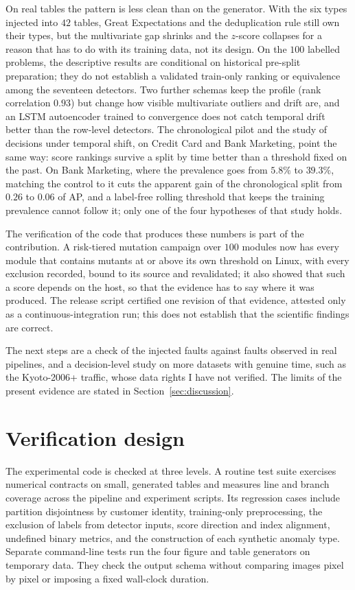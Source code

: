 \documentclass[conference]{IEEEtran}
\begin{document}
On real tables the pattern is less clean than on the generator. With the six
types injected into $42$ tables, Great Expectations and the deduplication rule
still own their types, but the multivariate gap shrinks and the $z$-score
collapses for a reason that has to do with its training data, not its design.
On the $100$ labelled problems, the descriptive results are conditional on
historical pre-split preparation; they do not establish a validated train-only
ranking or equivalence among the seventeen detectors. Two further schemas keep the profile (rank correlation
$0.93$) but change how visible multivariate outliers and drift are, and an LSTM
autoencoder trained to convergence does not catch temporal drift better than
the row-level detectors. The chronological pilot and the study of decisions under temporal shift, on
Credit Card and Bank Marketing, point the same way: score rankings survive a
split by time better than a threshold fixed on the past. On Bank Marketing, where
the prevalence goes from $5.8\%$ to $39.3\%$, matching the control to it cuts
the apparent gain of the chronological split from $0.26$ to $0.06$ of AP,
and a label-free rolling threshold that keeps the training prevalence cannot
follow it; only one of the four hypotheses of that study holds.

The verification of the code that produces these numbers is part of the contribution. A risk-tiered mutation
campaign over $100$ modules now has every module that contains mutants at or above its own threshold on Linux, with every exclusion recorded, bound to its
source and revalidated; it also showed that such a score depends on the host, so that the evidence has to say where it
was produced. The release script certified one revision of that evidence, attested only as a continuous-integration run; this does not establish that the scientific findings are correct.

The next steps are a check of the injected faults against faults observed in
real pipelines, and a decision-level study on more datasets with genuine time,
such as the Kyoto-2006+ traffic, whose data rights I have not verified. The limits of the present
evidence are stated in Section~\ref{sec:discussion}.


\appendices

\section{Verification design}
\label{app:design}
The experimental code is checked at three levels. A routine test suite
exercises numerical contracts on small, generated tables and measures
line and branch coverage across the pipeline and experiment scripts. Its
regression cases include partition disjointness by customer identity,
training-only preprocessing, the exclusion of labels from detector inputs,
score direction and index alignment, undefined binary metrics, and the
construction of each synthetic anomaly type. Separate command-line tests
run the four figure and table generators on temporary data. They check the
output schema without comparing images pixel by pixel or imposing a fixed
wall-clock duration.
\end{document}
